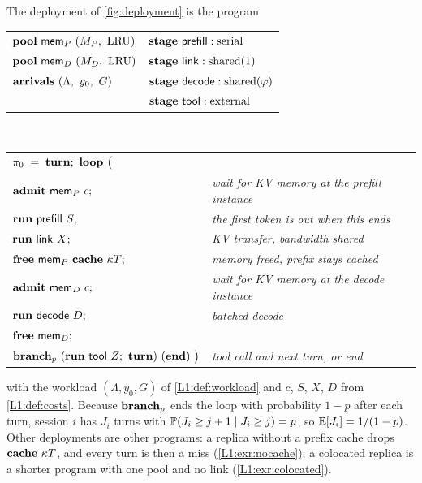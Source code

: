 \begin{example}\label{L1:ex:program}
The deployment of \cref{fig:deployment} is the program
\begin{center}
\begin{tabular}{@{}l@{\qquad}l@{}}
$\kw{pool}\ \mathsf{mem}_P\ (M_P,\ \mathrm{LRU})$ &
$\kw{stage}\ \mathsf{prefill} : \mathrm{serial}$ \\
$\kw{pool}\ \mathsf{mem}_D\ (M_D,\ \mathrm{LRU})$ &
$\kw{stage}\ \mathsf{link} : \mathrm{shared}(1)$ \\
$\kw{arrivals}\ (\Lambda,\ y_0,\ G)$ &
$\kw{stage}\ \mathsf{decode} : \mathrm{shared}(\varphi)$ \\
&
$\kw{stage}\ \mathsf{tool} : \mathrm{external}$
\end{tabular}
\\[0.6em]
\begin{tabular}{@{}l@{\qquad}l@{}}
$\pi_0 \;=\; \mathbf{turn};\ \mathbf{loop}\ \bigl($ & \\
\quad $\kw{admit}\ \mathsf{mem}_P\ c;$ & \emph{wait for KV memory at the prefill instance}\\
\quad $\kw{run}\ \mathsf{prefill}\ S;$ & \emph{the first token is out when this ends}\\
\quad $\kw{run}\ \mathsf{link}\ X;$ & \emph{KV transfer, bandwidth shared}\\
\quad $\kw{free}\ \mathsf{mem}_P\ \kw{cache}\ \kappa T;$ & \emph{memory freed, prefix stays cached}\\
\quad $\kw{admit}\ \mathsf{mem}_D\ c;$ & \emph{wait for KV memory at the decode instance}\\
\quad $\kw{run}\ \mathsf{decode}\ D;$ & \emph{batched decode}\\
\quad $\kw{free}\ \mathsf{mem}_D;$ & \\
\quad $\kw{branch}_p\ (\kw{run}\ \mathsf{tool}\ Z;\ \kw{turn})\ (\kw{end})\ \bigr)$ &
  \emph{tool call and next turn, or end}
\end{tabular}
\end{center}
with the workload $(\Lambda,y_0,G)$ of \cref{L1:def:workload} and $c$, $S$, $X$, $D$
from \cref{L1:def:costs}. Because $\mathbf{branch}_p$ ends the loop with probability $1-p$
after each turn, session $i$ has $J_i$ turns with
$\mathbb{P}(J_i\ge j+1\mid J_i\ge j)=p$, so $\mathbb{E}[J_i]=1/(1-p)$. Other deployments are other
programs: a replica without a prefix cache drops $\mathbf{cache}\ \kappa T$, and every turn
is then a miss (\cref{L1:exr:nocache}); a colocated replica is a shorter program with
one pool and no link (\cref{L1:exr:colocated}).
\end{example}

